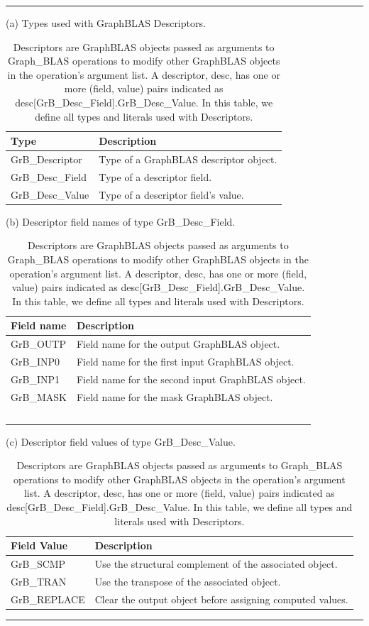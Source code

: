 \begin{table}
\hrule
\begin{center}
\caption{Descriptors are GraphBLAS objects passed as arguments to Graph\_BLAS 
operations to modify other GraphBLAS objects in the operation's argument list.
A descriptor, {\sf desc}, has one or more (field, value) pairs indicated 
as  {\sf desc[GrB\_Desc\_Field].GrB\_Desc\_Value}. In this table, we define all types and literals used
with Descriptors.}
\label{Tab:DescTypeLiterals}

\vspace{1\baselineskip}
(a) Types used with GraphBLAS Descriptors.
\vspace{1\baselineskip}

\begin{tabular}{l|l}
Type			& Description \\ \hline
{\sf GrB\_Descriptor}     &  Type of a GraphBLAS descriptor object. \\
{\sf GrB\_Desc\_Field}              &  Type of a descriptor field. \\
{\sf GrB\_Desc\_Value}             &  Type of a descriptor field's value. \\
\end{tabular}

\vspace{1\baselineskip}
(b) Descriptor field names of type {\sf GrB\_Desc\_Field}.
\vspace{1\baselineskip}

\begin{tabular}{l|l}
Field name          & Description \\ \hline
{\sf GrB\_OUTP} &  Field name for the output GraphBLAS object. \\
{\sf GrB\_INP0}   &  Field name for the first input GraphBLAS object. \\
{\sf GrB\_INP1}   &  Field name for the second input  GraphBLAS object. \\
{\sf GrB\_MASK} &  Field name for the mask GraphBLAS object. \\\
\end{tabular}

\vspace{1\baselineskip}
(c) Descriptor field values of type {\sf GrB\_Desc\_Value}.
\vspace{1\baselineskip}

\begin{tabular}{l|l}
Field Value                & Description \\ \hline
{\sf GrB\_SCMP}       &  Use the structural complement of the associated object.\\
{\sf GrB\_TRAN}        &  Use the transpose of the associated object.\\
{\sf GrB\_REPLACE} &  Clear the output object before assigning computed values.\\
\end{tabular}
\end{center}
\hrule
\end{table}

